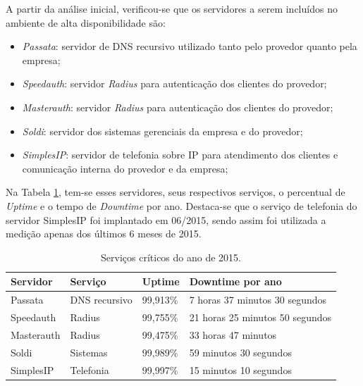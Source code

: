 A partir da análise inicial, verificou-se que os servidores a serem incluídos no ambiente de alta disponibilidade são:
\begin{itemize}
 \item \textit{Passata}: servidor de \ac{DNS} recursivo utilizado tanto pelo provedor quanto pela empresa;
 \item \textit{Speedauth}: servidor \textit{Radius} para autenticação dos clientes do provedor;
 \item \textit{Masterauth}: servidor \textit{Radius} para autenticação dos clientes do provedor;
 \item \textit{Soldi}: servidor dos sistemas gerenciais da empresa e do provedor;
 \item \textit{SimplesIP}: servidor de telefonia sobre \ac{IP} para atendimento dos clientes e comunicação interna do provedor e da empresa;
\end{itemize}

Na Tabela \ref{tab:dispservcrit}, tem-se esses servidores, seus respectivos serviços, o percentual de \textit{Uptime} e o tempo de 
\textit{Downtime} por ano. Destaca-se que o serviço de telefonia do servidor SimplesIP foi implantado em 06/2015, sendo assim foi utilizada a 
medição apenas dos últimos 6 meses de 2015. 

\begin{table}[h!]
\caption{Serviços críticos do ano de 2015.}
\label{tab:dispservcrit}
\begin{center}
\begin{tabular}{|l|l|l|l|}\hline
\textbf{Servidor} & \textbf{Serviço} & \textbf{Uptime} & \textbf{Downtime por ano} \\\hline
Passata & DNS recursivo & 99,913\% & 7 horas 37 minutos 30 segundos \\\hline
Speedauth & Radius & 99,755\% & 21 horas 25 minutos 50 segundos \\\hline
Masterauth & Radius & 99,475\% & 33 horas 47 minutos \\\hline
Soldi & Sistemas & 99,989\% & 59 minutos 30 segundos \\\hline
SimplesIP & Telefonia & 99,997\% & 15 minutos 10 segundos \\\hline %
\end{tabular}
\end{center}
\end{table}

